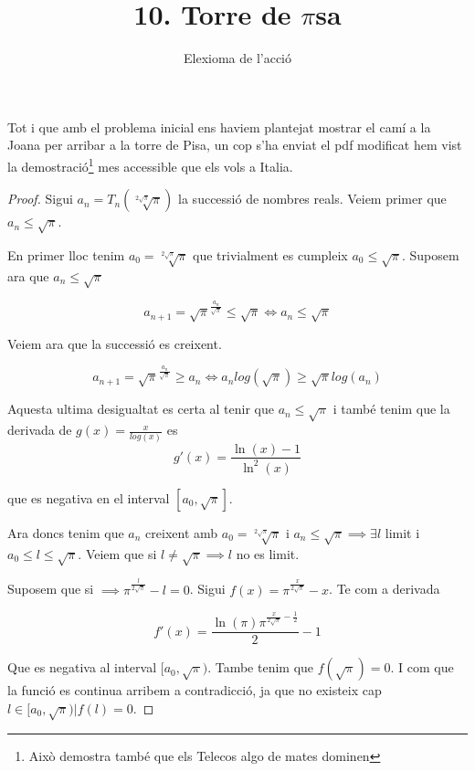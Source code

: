 \documentclass[12pt, a4papre]{article}
\author{Elexioma de l'acció}
\title{10. Torre de $\pi$sa}
\date{}
\begin{document}
	\maketitle

	Tot i que amb el problema inicial ens haviem plantejat mostrar el camí a la Joana per arribar a la torre de Pisa, un cop s'ha enviat el pdf modificat hem vist la demostració\footnote{Això demostra també que els Telecos algo de mates dominen} mes accessible que els vols a Italia.
	
	\begin{proof}
	Sigui $a_n = T_n(\sqrt[2\sqrt{\pi}]{\pi})$ la successió de nombres reals. Veiem primer que $a_n \leq \sqrt{\pi}$.
	
	En primer lloc tenim $a_0 = \sqrt[2\sqrt{\pi}]{\pi}$ que trivialment es cumpleix $a_0 \leq \sqrt{\pi}$. Suposem ara que $a_n \leq \sqrt{\pi}$
	
	\[	
		a_{n+1} = \sqrt{\pi}^{\frac{a_n}{\sqrt{\pi}}} \leq \sqrt{\pi} \iff a_n \leq \sqrt{\pi} 
	\]
	
	Veiem ara que la successió es creixent.
	
	\[
		a_{n+1} = \sqrt{\pi}^{\frac{a_n}{\sqrt{\pi}}} \geq a_n \iff a_nlog(\sqrt{\pi}) \geq \sqrt{\pi}log(a_n)
	\]
	
	Aquesta ultima desigualtat es certa al tenir que $a_n \leq \sqrt{\pi}$ i també tenim que la derivada de $g(x) = \frac{x}{log(x)}$  es 
	\[
		g'(x) = \dfrac{\ln\left(x\right)-1}{\ln^2\left(x\right)}
	\] 
	
	que es negativa en el interval $[a_0, \sqrt{\pi}]$.
	
	Ara doncs tenim que $a_n$ creixent amb $a_0 = \sqrt[2\sqrt{\pi}]{\pi}$ i $a_n \leq \sqrt{\pi}\implies \exists l$ limit i $a_0 \leq l \leq \sqrt{\pi}$. Veiem que si $l \neq \sqrt{\pi} \implies l$ no es limit.
	
	Suposem que si $\implies \pi^{\frac{l}{2\sqrt{\pi}}}-l = 0$. Sigui $f(x) = \pi^{\frac{x}{2\sqrt{\pi}}}-x$. Te com a derivada
	
	\[
		f'(x) = \dfrac{\ln\left({\pi}\right){\pi}^{\frac{x}{2\sqrt{{\pi}}}-\frac{1}{2}}}{2}-1
	\]
	
	Que es negativa al interval $[a_0, \sqrt{\pi})$. Tambe tenim que $f(\sqrt{\pi}) = 0$. I com que la funció es continua arribem a contradicció, ja que no existeix cap $l \in [a_0, \sqrt{\pi}) | f(l) = 0$.

	\end{proof}
	
	
	
	
\end{document}
